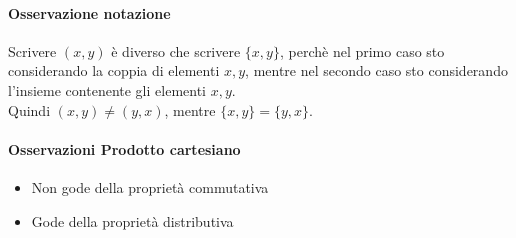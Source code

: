 \paragraph*{Osservazione notazione} Scrivere $(x, y)$ è diverso che scrivere $\{x, y\}$,
perchè nel primo caso sto considerando la coppia di elementi $x, y$, mentre nel 
secondo caso sto considerando l'insieme contenente gli elementi $x, y$.\\
Quindi $(x, y) \neq (y, x)$, mentre $\{x, y\} = \{y, x\}$.
\paragraph*{Osservazioni Prodotto cartesiano} 
\begin{itemize}
	\item Non gode della proprietà commutativa
	\item Gode della proprietà distributiva
\end{itemize}
